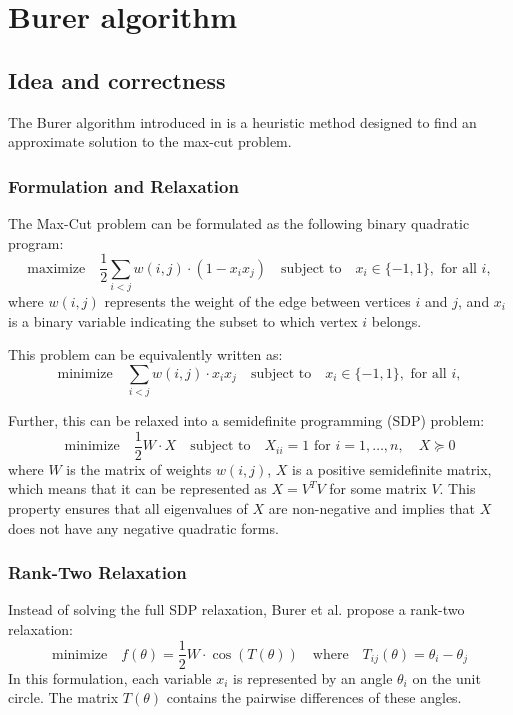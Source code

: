 \section{Burer algorithm}
\label{sec:burer}

    \subsection{Idea and correctness}

The Burer algorithm introduced in \cite{burer2002rank} is a heuristic method designed to find an approximate solution to the max-cut problem.

\subsubsection{Formulation and Relaxation}

The Max-Cut problem can be formulated as the following binary quadratic program:
\[
\text{maximize} \quad \frac{1}{2} \sum_{i < j} w(i, j) \cdot (1 - x_i x_j) \quad \text{subject to} \quad x_i \in \{-1, 1\}, \text{ for all } i,
\]
where \( w(i, j)\) represents the weight of the edge between vertices \(i\) and \(j\), and \(x_i\) is a binary variable indicating the subset to which vertex \(i\) belongs.

This problem can be equivalently written as:
\[
\text{minimize} \quad \sum_{i < j} w(i, j) \cdot x_i x_j \quad \text{subject to} \quad x_i \in \{-1, 1\}, \text{ for all } i,
\]

Further, this can be relaxed into a semidefinite programming (SDP) problem:
\[
\text{minimize} \quad \frac{1}{2} W \cdot X \quad \text{subject to} \quad X_{ii} = 1 \text{ for } i = 1, \ldots, n, \quad X \succeq 0
\]
where \(W\) is the matrix of weights \( w(i, j)\), \(X\) is a positive semidefinite matrix, which means that it can be represented as \(X = V^T V\) for some matrix \(V\). This property ensures that all eigenvalues of \(X\) are non-negative and implies that \(X\) does not have any negative quadratic forms.


\subsubsection{ Rank-Two Relaxation }

Instead of solving the full SDP relaxation, Burer et al. propose a rank-two relaxation:
\[
\text{minimize} \quad f(\theta) = \frac{1}{2} W \cdot \cos(T(\theta)) \quad \text{where} \quad T_{ij}(\theta) = \theta_i - \theta_j
\]
In this formulation, each variable \(x_i\) is represented by an angle \(\theta_i\) on the unit circle. The matrix \(T(\theta)\) contains the pairwise differences of these angles.

